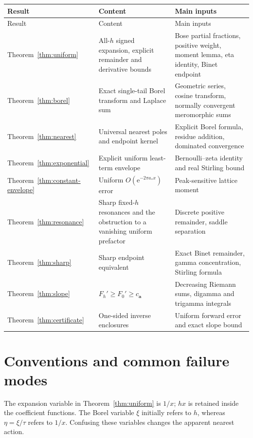 \documentclass[11pt,a4paper]{article}
\numberwithin{equation}{section}
\theoremstyle{definition}\newtheorem{definition}[theorem]{Definition}
\theoremstyle{remark}\newtheorem{remark}[theorem]{Remark}
\newcommand{\e}{\mathrm e}
\newcommand{\avec}{\boldsymbol a}
\begin{document}
\begin{longtable}{@{}>{\raggedright\arraybackslash}p{}>{\raggedright\arraybackslash}p{}>{\raggedright\arraybackslash}p{}@{}}
\toprule
Result & Content & Main inputs\\\midrule
\endfirsthead
\toprule Result & Content & Main inputs\\\midrule\endhead
Theorem~\ref{thm:uniform} & All-$h$ signed expansion, explicit remainder and derivative bounds & Bose partial fractions, positive weight, moment lemma, eta identity, Binet endpoint\\[4pt]
Theorem~\ref{thm:borel} & Exact single-tail Borel transform and Laplace sum & Geometric series, cosine transform, normally convergent meromorphic sums\\[4pt]
Theorem~\ref{thm:nearest} & Universal nearest poles and endpoint kernel & Explicit Borel formula, residue addition, dominated convergence\\[4pt]
Theorem~\ref{thm:exponential} & Explicit uniform least-term envelope & Bernoulli--zeta identity and real Stirling bound\\[4pt]
Theorem~\ref{thm:constant-envelope} & Uniform $O(\e^{-2\pi a_*x})$ error & Peak-sensitive lattice moment\\[4pt]
Theorem~\ref{thm:resonance} & Sharp fixed-$h$ resonances and the obstruction to a vanishing uniform prefactor & Discrete positive remainder, saddle separation\\[4pt]
Theorem~\ref{thm:sharp} & Sharp endpoint equivalent & Exact Binet remainder, gamma concentration, Stirling formula\\[4pt]
Theorem~\ref{thm:slope} & $F_h'\ge F_0'\ge c_{\avec}$ & Decreasing Riemann sums, digamma and trigamma integrals\\[4pt]
Theorem~\ref{thm:certificate} & One-sided inverse enclosures & Uniform forward error and exact slope bound\\
\bottomrule
\end{longtable}

\section{Conventions and common failure modes}

The expansion variable in Theorem~\ref{thm:uniform} is $1/x$; $hx$ is retained
inside the coefficient functions. The Borel variable $\xi$ initially refers
to $h$, whereas $\eta=\xi/\tau$ refers to $1/x$. Confusing these variables
changes the apparent nearest action.
\end{document}
